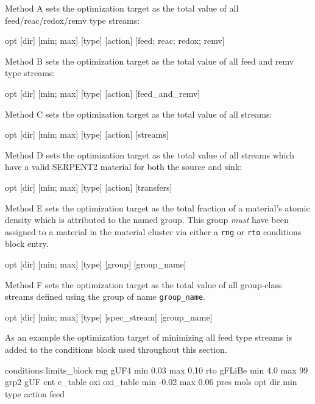\noindent Method A sets the optimization target as the total value of all
feed/reac/redox/remv type streams:

\begin{lt}
opt [dir] [{min; max}] [type] [action] {[feed; reac; redox; remv]} 
\end{lt}

\noindent Method B sets the optimization target as the total value of all 
feed and remv type streams:

\begin{lt}
opt [dir] [{min; max}] [type] [action] [feed_and_remv] 
\end{lt}

\noindent Method C sets the optimization target as the total value of all 
streams: 

\begin{lt}
opt [dir] [{min; max}] [type] [action] [streams] 
\end{lt}

\noindent Method D sets the optimization target as the total value of all 
streams which have a valid SERPENT2 material for both the source and sink:

\begin{lt}
opt [dir] [{min; max}] [type] [action] [transfers]
\end{lt}

\noindent Method E sets the optimization target as the total fraction of a
material's atomic density which is attributed to the named group. This group
\textit{must} have been assigned to a material in the material cluster via
either a \texttt{rng} or \texttt{rto} conditions block entry.

\begin{lt}
opt [dir] [{min; max}] [type] [group] [group_name]
\end{lt}

\noindent Method F sets the optimization target as the total value of all
group-class streams defined using the group of name \texttt{group\_name}.
\begin{lt}
opt [dir] [{min; max}] [type] [spec_stream] [group_name]
\end{lt}

As an example the optimization target of minimizing all feed type streams is
added to the conditions block used throughout this section.

\begin{li}
conditions limits_block
rng gUF4    min 0.03    max 0.10
rto gFLiBe  min 4.0 max 99  grp2    gUF
cnt c_table
oxi oxi_table min -0.02 max 0.06
pres mols
opt dir min type action feed
\end{li}

